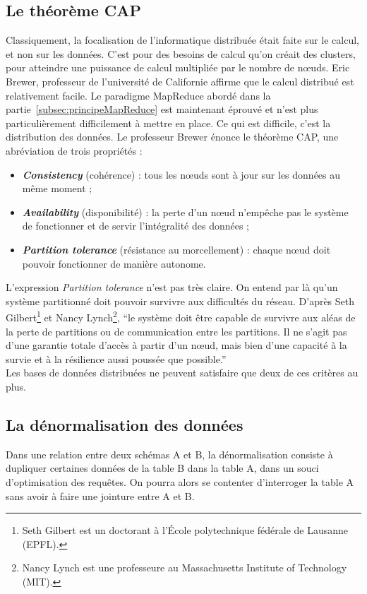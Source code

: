 \subsection{Le théorème CAP}
\label{subsec:theoremeCAP}
	Classiquement, la focalisation de l'informatique distribuée était faite sur le calcul, et non sur les données. C'est pour des besoins de calcul qu'on créait des clusters, pour atteindre une puissance de calcul multipliée par le nombre de nœuds. Eric Brewer, professeur de l'université de Californie affirme que le calcul distribué est relativement facile. Le paradigme MapReduce abordé dans la partie~\ref{subsec:principeMapReduce} est maintenant éprouvé et n'est plus particulièrement difficilement à mettre en place. Ce qui est difficile, c'est la distribution des données. Le professeur Brewer énonce le théorème CAP, une abréviation de trois propriétés :
	\vspace{10px}
	\begin{itemize}
		\item \textbf{\textit{Consistency}} (cohérence) : tous les nœuds sont à jour sur les données au même moment ; 
		\item \textbf{\textit{Availability}} (disponibilité) : la perte d'un nœud n'empêche pas le système de fonctionner et de servir l'intégralité des données ; 
		\item \textbf{\textit{Partition tolerance}} (résistance au morcellement) : chaque nœud doit pouvoir fonctionner de manière autonome. 
	\end{itemize}
	\vspace{20px}
	L'expression \textit{Partition tolerance} n'est pas très claire. On entend par là qu'un système partitionné doit pouvoir survivre aux difficultés du réseau. D'après Seth Gilbert\footnote{Seth Gilbert est un doctorant à l'École polytechnique fédérale de Lausanne (EPFL).} et Nancy Lynch\footnote{Nancy Lynch est une professeure au Massachusetts Institute of Technology (MIT).}, \enquote{le système doit être capable de survivre aux aléas de la perte de partitions ou de communication entre les partitions. Il ne s'agit pas d'une garantie totale d'accès à partir d'un nœud, mais bien d'une capacité à la survie et à la résilience aussi poussée que possible.}\\

	Les bases de données distribuées ne peuvent satisfaire que deux de ces critères au plus.

\subsection{La dénormalisation des données}
	Dans une relation entre deux schémas A et B, la dénormalisation consiste à dupliquer certaines données de la table B dans la table A, dans un souci d'optimisation des requêtes. On pourra alors se contenter d'interroger la table A sans avoir à faire une jointure entre A et B.\\

